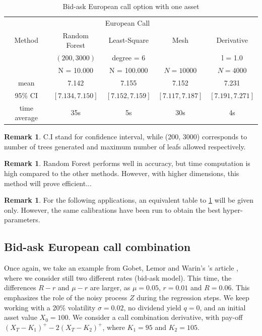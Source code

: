 \documentclass[english,11pt,openany]{report}
\theoremstyle{definition}
\theoremstyle{plain}
\theoremstyle{definition}
\newtheorem{Rem}[Th]{Remark}
\begin{document}
\begin{table}[H]
	\centering
	\caption{Bid-ask European call option with one asset}\label{table:bid_ask_european_call_1D}
	\begin{tabular}{*5c}
		\toprule
		& \multicolumn{3}{c}{European Call} \\
		\cmidrule(lr){2-5}
		Method & Random Forest  & Least-Square & Mesh & Derivative \\    
		& $(200, 3000)$ & degree = $6$     &  &  l = 1.0\\
		& N = 10.000 & N = 100.000     & $N = 10 000$  &$N = 4 000$   \\
		\midrule
		mean &     7.142   & 7.155  &  7.152  &  7.231 \\ 
		95\% CI &   $[7.134, 7.150]$     &    $[7.152, 7.159]$     & $[7.117, 7.187]$ & $[7.191, 7.271]$  \\
		time average &  35s   & 5s & 30s & 4s \\
		\bottomrule
	\end{tabular}
\end{table}

\begin{Rem}
	C.I stand for confidence interval, while (200, 3000) corresponds to number of trees generated and maximum number of leafs allowed respectively.
\end{Rem}

\begin{Rem}
	Random Forest performs well in accuracy, but time computation is high compared to the other methods. However, with higher dimensions, this method will prove efficient...
\end{Rem}

\begin{Rem}
For the following applications, an equivalent table to \ref{table:bid_ask_european_call_1D} will be given only.
However, the same calibrations have been run to obtain the best hyper-parameters.
\end{Rem}


\subsection{Bid-ask European call combination}

Once again, we take an example from Gobet, Lemor and Warin's 's article \cite{gobet:example}, where we consider still two different rates (bid-ask model). This time, the differences $R-r$ and $\mu - r$ are larger, as $\mu = 0.05$, $r=0.01$ and $R=0.06$. This emphasizes the role of the noisy process $Z$ during the regression steps. 
We keep working with a 20\% volatility $\sigma=0.02$, no dividend yield $q=0$, and an initial asset value $X_0 = 100$. We consider a call combination derivative, with pay-off $(X_T - K_1)^+ - 2(X_T - K_2)^+$, where $K_1 = 95$ and $K_2 = 105$.
\end{document}
